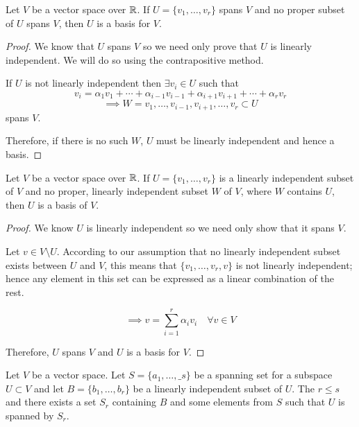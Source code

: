 \documentclass[a4paper,10pt]{article}
\begin{document}
\begin{thm}
	Let $V$ be a vector space over $\mathbb{R}$. If $U = \{v_1, \ldots,
	v_r\}$ spans $V$ and no proper subset of $U$ spans $V$, then $U$
	is a basis for $V$.
\end{thm}

\begin{proof}
	We know that $U$ spans $V$ so we need only prove that $U$ is linearly independent. We will do so using the contrapositive method.

	If $U$ is not linearly independent then $\exists v_i \in U$ such that
	\[
		v_i = \alpha_1 v_1 + \cdots + \alpha_{i-1} v_{i-1} +
		\alpha_{i+1} v_{i+1} + \cdots + \alpha_r v_r
	\]
	\[
		\implies
		W = {v_1, \ldots, v_{i-1}, v_{i+1}, \ldots, v_r}
		\subset U
	\]
	spans $V$.

	Therefore, if there is no such $W$, $U$ must be linearly
	independent and hence a basis.
\end{proof}

\begin{thm}
	Let $V$ be a vector space over $\mathbb{R}$. If $U = \{v_1, \ldots, v_r\}$
	is a linearly independent subset of $V$ and no proper, linearly
	independent  subset $W$ of $V$, where $W$ contains $U$, then $U$
	is a basis of $V$.
\end{thm}

\begin{proof}
	We know $U$ is linearly independent so we need only show that it
	spans $V$.

	Let $v \in V \setminus U$. According to our assumption that no
	linearly independent subset exists between $U$ and $V$, this
	means that $\{v_1, \ldots, v_r, v\}$ is  not linearly
	independent; hence any element in this set can be expressed as a
	linear combination of the rest.

	\[
		\implies
		v = \sum_{i=1}^r \alpha_i v_i \quad \forall v \in V
	\]

	Therefore, $U$ spans $V$ and $U$ is a basis for $V$.
\end{proof}

\begin{lemma}
	Let $V$ be a vector space. Let $S = \{a_1, \ldots, \_s\}$ be a
	spanning set for a subspace $U \subset V$ and let $B = \{b_1,
	\ldots, b_r\}$ be a linearly independent subset of $U$. The $r
	\leq s$ and there exists a set $S_r$ containing $B$ and some
	elements from $S$ such that $U$ is spanned by $S_r$.
\end{lemma}
\end{document}
